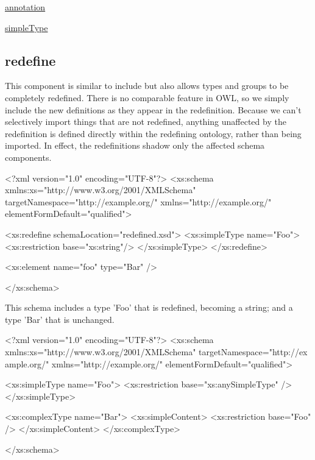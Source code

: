 \begin{DoxyItemize}
\item \hyperlink{annotation}{annotation}
\item \hyperlink{simpletype}{simpleType} 
\end{DoxyItemize}\hypertarget{redefine}{}\subsection{redefine}\label{redefine}
This component is similar to include but also allows types and groups to be completely redefined. There is no comparable feature in OWL, so we simply include the new definitions as they appear in the redefinition. Because we can't selectively import things that are not redefined, anything unaffected by the redefinition is defined directly within the redefining ontology, rather than being imported. In effect, the redefinitions shadow only the affected schema components.


\begin{DoxyCodeInclude}
<?xml version="1.0" encoding="UTF-8"?>
<xs:schema xmlns:xs="http://www.w3.org/2001/XMLSchema"
        targetNamespace="http://example.org/" xmlns="http://example.org/"
        elementFormDefault="qualified">
        
        <xs:redefine schemaLocation="redefined.xsd">
                <xs:simpleType name="Foo">
                        <xs:restriction base="xs:string"/>
                </xs:simpleType>
        </xs:redefine>
        
        <xs:element name="foo" type="Bar" />
        
</xs:schema>
\end{DoxyCodeInclude}


This schema includes a type 'Foo' that is redefined, becoming a string; and a type 'Bar' that is unchanged.


\begin{DoxyCodeInclude}
<?xml version="1.0" encoding="UTF-8"?>
<xs:schema xmlns:xs="http://www.w3.org/2001/XMLSchema" targetNamespace="http://ex
      ample.org/" 
        xmlns="http://example.org/" elementFormDefault="qualified">
        
        <xs:simpleType name="Foo">
                <xs:restriction base="xs:anySimpleType" />
        </xs:simpleType>

        <xs:complexType name="Bar">
                <xs:simpleContent>
                        <xs:restriction base="Foo" />
                </xs:simpleContent>
        </xs:complexType>

</xs:schema>
\end{DoxyCodeInclude}
 
